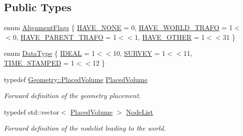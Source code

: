 \subsection*{Public Types}
\begin{DoxyCompactItemize}
\item 
enum \hyperlink{class_d_d4hep_1_1_alignments_1_1_alignment_data_a3fb06356abe173269ebc8fd920758357}{AlignmentFlags} \{ \hyperlink{class_d_d4hep_1_1_alignments_1_1_alignment_data_a3fb06356abe173269ebc8fd920758357a39cb02a2920b8bdb2eedc7acb4850cb0}{HAVE\_\-NONE} =  0, 
\hyperlink{class_d_d4hep_1_1_alignments_1_1_alignment_data_a3fb06356abe173269ebc8fd920758357a5313d8f5443b29d79e0a7224e792c77b}{HAVE\_\-WORLD\_\-TRAFO} =  1$<$$<$0, 
\hyperlink{class_d_d4hep_1_1_alignments_1_1_alignment_data_a3fb06356abe173269ebc8fd920758357a826ef227187d7394b7b3e25de2a5b726}{HAVE\_\-PARENT\_\-TRAFO} =  1$<$$<$1, 
\hyperlink{class_d_d4hep_1_1_alignments_1_1_alignment_data_a3fb06356abe173269ebc8fd920758357a2dad19301a6794d458d3fc73c39f19cd}{HAVE\_\-OTHER} =  1$<$$<$31
 \}
\item 
enum \hyperlink{class_d_d4hep_1_1_alignments_1_1_alignment_data_aaa782eebf5973a2c4e62065aee0fb7bb}{DataType} \{ \hyperlink{class_d_d4hep_1_1_alignments_1_1_alignment_data_aaa782eebf5973a2c4e62065aee0fb7bba048ee5fdb4e1df4ca23db3fe394b257b}{IDEAL} =  1$<$$<$10, 
\hyperlink{class_d_d4hep_1_1_alignments_1_1_alignment_data_aaa782eebf5973a2c4e62065aee0fb7bbaa17c5923f6fe305c0f1f0d99940d8d3a}{SURVEY} =  1$<$$<$11, 
\hyperlink{class_d_d4hep_1_1_alignments_1_1_alignment_data_aaa782eebf5973a2c4e62065aee0fb7bba35a70b0b654b7c0e05eb913790bd4fdc}{TIME\_\-STAMPED} =  1$<$$<$12
 \}
\item 
typedef \hyperlink{class_d_d4hep_1_1_geometry_1_1_placed_volume}{Geometry::PlacedVolume} \hyperlink{class_d_d4hep_1_1_alignments_1_1_alignment_data_aab2d43f5a4a4c2163e0a04905306525a}{PlacedVolume}
\begin{DoxyCompactList}\small\item\em Forward definition of the geometry placement. \item\end{DoxyCompactList}\item 
typedef std::vector$<$ \hyperlink{class_d_d4hep_1_1_geometry_1_1_placed_volume}{PlacedVolume} $>$ \hyperlink{class_d_d4hep_1_1_alignments_1_1_alignment_data_a3a667fd798d7523d75accee832d64521}{NodeList}
\begin{DoxyCompactList}\small\item\em Forward definition of the nodelist leading to the world. \item\end{DoxyCompactList}\item 

\end{DoxyCompactItemize}
